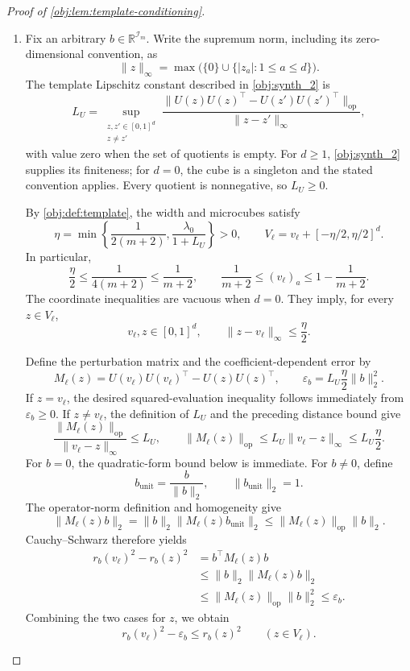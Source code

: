 \documentclass[11pt]{article}
\begin{document}
\begin{proof}[Proof of \cref{obj:lem:template-conditioning}]
\begin{enumerate}
\item Fix an arbitrary \(b\in\mathbb R^{\mathcal I_m}\). Write the supremum norm, including its zero-dimensional convention, as
\[
\|z\|_\infty
=\max\bigl(\{0\}\cup\{|z_a|:1\le a\le d\}\bigr).
\]
The template Lipschitz constant described in \cref{obj:synth_2} is
\[
L_U=
\sup_{\substack{z,z'\in[0,1]^d\\z\ne z'}}
\frac{\|U(z)U(z)^\top-U(z')U(z')^\top\|_{\mathrm{op}}}
{\|z-z'\|_\infty},
\]
with value zero when the set of quotients is empty. For \(d\ge1\),
\cref{obj:synth_2} supplies its finiteness; for \(d=0\), the cube is a singleton and the stated convention applies. Every quotient is nonnegative, so \(L_U\ge0\).

By \cref{obj:def:template}, the width and microcubes satisfy
\[
\eta=\min\left\{\frac1{2(m+2)},\frac{\lambda_0}{1+L_U}\right\}>0,
\qquad
V_\ell=v_\ell+[-\eta/2,\eta/2]^d.
\]
In particular,
\[
\frac{\eta}{2}\le\frac1{4(m+2)}\le\frac1{m+2},
\qquad
\frac1{m+2}\le(v_\ell)_a
\le1-\frac1{m+2}.
\]
The coordinate inequalities are vacuous when \(d=0\). They imply, for every \(z\in V_\ell\),
\[
v_\ell,z\in[0,1]^d,
\qquad
\|z-v_\ell\|_\infty\le\frac{\eta}{2}.
\]

Define the perturbation matrix and the coefficient-dependent error by
\[
M_\ell(z)
=U(v_\ell)U(v_\ell)^\top-U(z)U(z)^\top,
\qquad
\varepsilon_b=L_U\frac{\eta}{2}\|b\|_2^2.
\]
If \(z=v_\ell\), the desired squared-evaluation inequality follows immediately from \(\varepsilon_b\ge0\). If \(z\ne v_\ell\), the definition of \(L_U\) and the preceding distance bound give
\[
\frac{\|M_\ell(z)\|_{\mathrm{op}}}{\|v_\ell-z\|_\infty}
\le L_U,
\qquad
\|M_\ell(z)\|_{\mathrm{op}}
\le L_U\|v_\ell-z\|_\infty
\le L_U\frac{\eta}{2}.
\]
For \(b=0\), the quadratic-form bound below is immediate. For \(b\ne0\), define
\[
b_{\mathrm{unit}}=\frac{b}{\|b\|_2},
\qquad
\|b_{\mathrm{unit}}\|_2=1.
\]
The operator-norm definition and homogeneity give
\[
\|M_\ell(z)b\|_2
=\|b\|_2\|M_\ell(z)b_{\mathrm{unit}}\|_2
\le\|M_\ell(z)\|_{\mathrm{op}}\|b\|_2.
\]
Cauchy--Schwarz therefore yields
\[
\begin{aligned}
r_b(v_\ell)^2-r_b(z)^2
&=b^\top M_\ell(z)b\\
&\le\|b\|_2\|M_\ell(z)b\|_2\\
&\le\|M_\ell(z)\|_{\mathrm{op}}\|b\|_2^2
\le\varepsilon_b.
\end{aligned}
\]
Combining the two cases for \(z\), we obtain
\[
r_b(v_\ell)^2-\varepsilon_b\le r_b(z)^2
\qquad(z\in V_\ell).
\]


\end{enumerate}
\end{proof}
\end{document}
